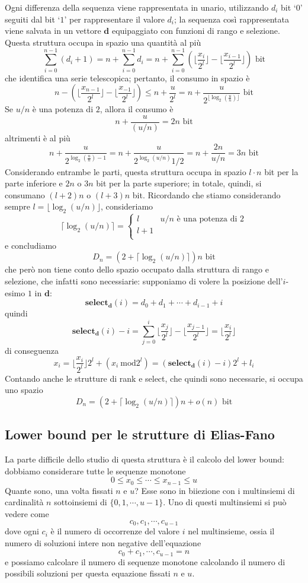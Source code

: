 Ogni differenza della sequenza viene rappresentata in unario, utilizzando $d_i$ bit
`$0$' seguiti dal bit `$1$' per rappresentare il valore $d_i$; la sequenza 
così rappresentata viene salvata in un vettore $\mathbf{d}$ equipaggiato 
con funzioni di rango e selezione. Questa struttura occupa in spazio 
una quantità al più 
$$
\sum_{i = 0}^{n - 1}(d_i + 1) = n + \sum_{i=0}^{n-1} d_i 
= n + \sum_{i = 0}^{n-1} (\lfloor{\frac{x_i}{2^l}}\rfloor - \lfloor{\frac{x_{i-1}}{2^l}}\rfloor) \text{ bit}
$$
che identifica una serie telescopica; pertanto, il consumo in spazio è 
$$
    n - (\lfloor{\frac{x_{n-1}}{2^l}}\rfloor -\lfloor{\frac{x_{-1}}{2^l}}\rfloor) \leq n + \frac{u}{2^l} 
    = n + \frac{u}{2^{\lfloor \log_2(\frac{u}{n})\rfloor}} \text{ bit}
$$
Se $u/n$ è una potenza di $2$, allora il consumo è 
$$
n + \frac{u}{(u/n)} = 2n \text{ bit}
$$
altrimenti è al più
$$
n + \frac{u}{2^{\log_2(\frac{u}{n}) - 1 }} = n + \frac{u}{2^{\log_2(u/n)}1/2} = n + \frac{2n}{u/n} = 3n \text{ bit}
$$
Considerando entrambe le parti, questa struttura occupa in spazio $l\cdot n$ bit 
per la parte inferiore e $2n$ o $3n$ bit per la parte superiore; in totale, 
quindi, si consumano $(l+2)n$ o $(l+3)n$ bit. 
Ricordando che stiamo considerando sempre $l = \lfloor \log_2(u/n) \rfloor$, consideriamo
$$
	\lceil \log_2(u/n) \rceil =
	\begin{cases}
		l & u/n \text{ è una potenza di } 2 \\
		l +1                                \\
	\end{cases}
$$
e concludiamo
$$
	D_n = (2 + \lceil \log_2(u/n) \rceil) n \text{ bit}
$$
che però non tiene conto dello spazio occupato dalla struttura di rango e selezione, 
che infatti sono necessiarie: supponiamo di volere la posizione dell'$i$-esimo $1$ in $\mathbf{d}$:
$$
	\mathbf{select_d}(i) = d_0 + d_1 + \cdots + d_{i-1} + i
$$
quindi 
$$ 
\mathbf{select_d}(i) - i = \sum_{j = 0}^i \lfloor{\frac{x_{j}}{2^l}}\rfloor -\lfloor{\frac{x_{j-1}}{2^l}}\rfloor  = \lfloor \frac{x_i}{2^l} \rfloor
$$
di conseguenza 
$$
    x_i =  \lfloor \frac{x_i}{2^l} \rfloor 2^l + (x_i ~ \mathrm{mod}{2^l}) = (\mathbf{select_d}(i) - i ) 2^l + l_i
$$
Contando anche le strutture di rank e select, che quindi sono necessarie, si occupa uno spazio
$$
	D_n = (2 + \lceil \log_2(u/n) \rceil)n + o(n) \text{ bit}
$$

\subsection{Lower bound per le strutture di Elias-Fano}
La parte difficile dello studio di questa struttura è il calcolo del lower bound: 
dobbiamo considerare tutte le sequenze monotone
$$
	0 \leq x_0 \leq \cdots \leq x_{n-1} \le u
$$
Quante sono, una volta fissati $n$ e $u$? Esse sono in biiezione con i multinsiemi di cardinalità
$n$ sottoinsiemi di $\{0,1, \cdots, u-1\}$. Uno di questi multinsiemi si può vedere come
$$
	c_0, c_1, \cdots, c_{u-1}
$$
dove ogni $c_i$ è il numero di occorrenze del valore $i$ nel multinsieme, ossia
il numero di soluzioni intere non negative dell'equazione 
$$
    c_0 + c_1, \cdots, c_{u-1} = n
$$
e possiamo calcolare il numero di sequenze monotone calcolando il numero 
di possibili soluzioni per questa equazione fissati $n$ e $u$.

